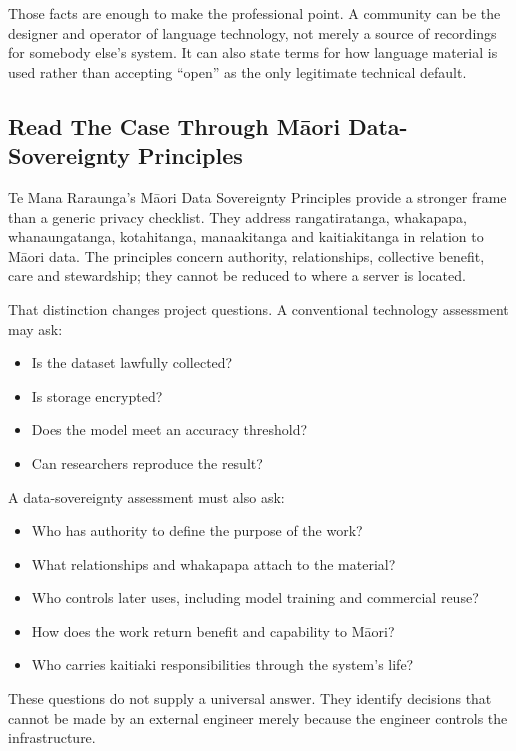 Those facts are enough to make the professional point. A community can be the designer and operator of language technology, not merely a source of recordings for somebody else's system. It can also state terms for how language material is used rather than accepting ``open'' as the only legitimate technical default.



\subsection{Read The Case Through Māori Data-Sovereignty Principles}


Te Mana Raraunga's Māori Data Sovereignty Principles provide a stronger frame than a generic privacy checklist. They address rangatiratanga, whakapapa, whanaungatanga, kotahitanga, manaakitanga and kaitiakitanga in relation to Māori data. The principles concern authority, relationships, collective benefit, care and stewardship; they cannot be reduced to where a server is located. \autocite{te-mana-raraunga}


That distinction changes project questions. A conventional technology assessment may ask:


\begin{itemize}[leftmargin=*]
\item Is the dataset lawfully collected?
\item Is storage encrypted?
\item Does the model meet an accuracy threshold?
\item Can researchers reproduce the result?
\end{itemize}

A data-sovereignty assessment must also ask:


\begin{itemize}[leftmargin=*]
\item Who has authority to define the purpose of the work?
\item What relationships and whakapapa attach to the material?
\item Who controls later uses, including model training and commercial reuse?
\item How does the work return benefit and capability to Māori?
\item Who carries kaitiaki responsibilities through the system's life?
\end{itemize}

These questions do not supply a universal answer. They identify decisions that cannot be made by an external engineer merely because the engineer controls the infrastructure.



